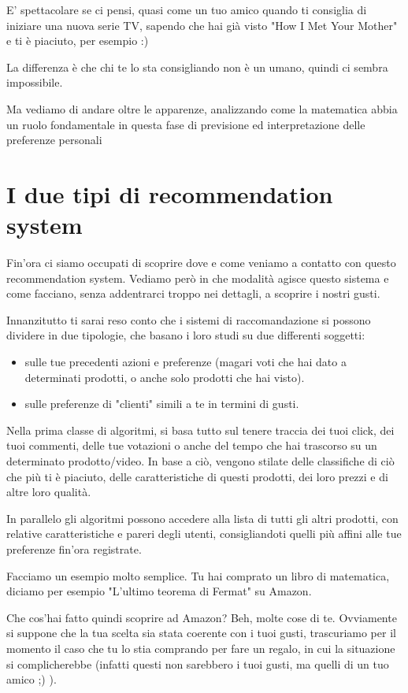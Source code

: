 E' spettacolare se ci pensi, quasi come un tuo amico quando ti consiglia di iniziare una nuova serie TV, sapendo che hai già visto "How I Met Your Mother" e ti è piaciuto, per esempio :)

La differenza è che chi te lo sta consigliando non è un umano, quindi ci sembra impossibile.

Ma vediamo di andare oltre le apparenze, analizzando come la matematica abbia un ruolo fondamentale in questa fase di previsione ed interpretazione delle preferenze personali 

\section{I due tipi di recommendation system}

Fin'ora ci siamo occupati di scoprire dove e come veniamo a contatto con questo recommendation system. Vediamo però in che modalità agisce questo sistema e come facciano, senza addentrarci troppo nei dettagli, a scoprire i nostri gusti.

Innanzitutto ti sarai reso conto che i sistemi di raccomandazione si possono dividere in due tipologie, che basano i loro studi su due differenti soggetti:
\begin{itemize}
	\item sulle tue precedenti azioni e preferenze (magari voti che hai dato a determinati prodotti, o anche solo prodotti che hai visto).
	\item sulle preferenze di "clienti" simili a te in termini di gusti.
\end{itemize}
Nella prima classe di algoritmi, si basa tutto sul tenere traccia dei tuoi click, dei tuoi commenti, delle tue votazioni o anche del tempo che hai trascorso su un determinato prodotto/video. In base a ciò, vengono stilate delle classifiche di ciò che più ti è piaciuto, delle caratteristiche di questi prodotti, dei loro prezzi e di altre loro qualità.

In parallelo gli algoritmi possono accedere alla lista di tutti gli altri prodotti, con relative caratteristiche e pareri degli utenti, consigliandoti quelli più affini alle tue preferenze fin'ora registrate.

Facciamo un esempio molto semplice. Tu hai comprato un libro di matematica, diciamo per esempio "L'ultimo teorema di Fermat" su Amazon.

Che cos'hai fatto quindi scoprire ad Amazon? Beh, molte cose di te. Ovviamente si suppone che la tua scelta sia stata coerente con i tuoi gusti, trascuriamo per il momento il caso che tu lo stia comprando per fare un regalo, in cui la situazione si complicherebbe (infatti questi non sarebbero i tuoi gusti, ma quelli di un tuo amico ;) ).

